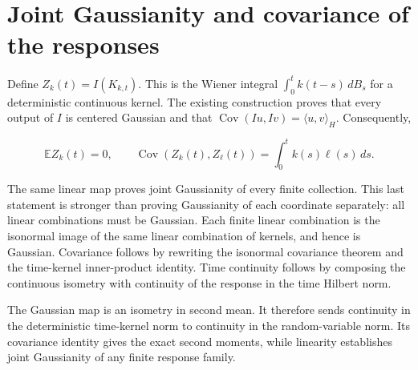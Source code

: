 \documentclass[11pt,a4paper]{article}
\begin{document}
\section{\texorpdfstring{Joint Gaussianity and covariance of the responses}{Joint Gaussianity and covariance of the responses}}


Define \(Z_k(t)=I(K_{k,t})\). This is the Wiener integral \(\int_0^t k(t-s)\,dB_s\) for a deterministic continuous kernel. The existing construction proves that every output of \(I\) is centered Gaussian and that \(\operatorname{Cov}(Iu,Iv)=\langle u,v\rangle_H\). Consequently,

\[\mathbb E Z_k(t)=0,\qquad \operatorname{Cov}(Z_k(t),Z_\ell(t))=\int_0^t k(s)\ell(s)\,ds.\]

The same linear map proves joint Gaussianity of every finite collection. This last statement is stronger than proving Gaussianity of each coordinate separately: all linear combinations must be Gaussian. Each finite linear combination is the isonormal image of the same linear combination of kernels, and hence is Gaussian. Covariance follows by rewriting the isonormal covariance theorem and the time-kernel inner-product identity. Time continuity follows by composing the continuous isometry with continuity of the response in the time Hilbert norm.



The Gaussian map is an isometry in second mean. It therefore sends continuity in the deterministic time-kernel norm to continuity in the random-variable norm. Its covariance identity gives the exact second moments, while linearity establishes joint Gaussianity of any finite response family.
\end{document}

